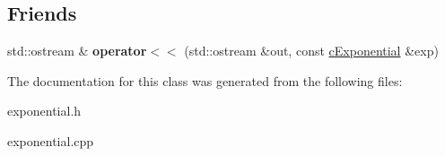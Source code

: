 \subsection*{Friends}
\begin{DoxyCompactItemize}
\item 
\hypertarget{classcExponential_a563dcb0f536fdeeea8de3064ddd6bd02}{std\-::ostream \& {\bfseries operator$<$$<$} (std\-::ostream \&out, const \hyperlink{classcExponential}{c\-Exponential} \&exp)}\label{classcExponential_a563dcb0f536fdeeea8de3064ddd6bd02}

\end{DoxyCompactItemize}


The documentation for this class was generated from the following files\-:\begin{DoxyCompactItemize}
\item 
exponential.\-h\item 
exponential.\-cpp\end{DoxyCompactItemize}
